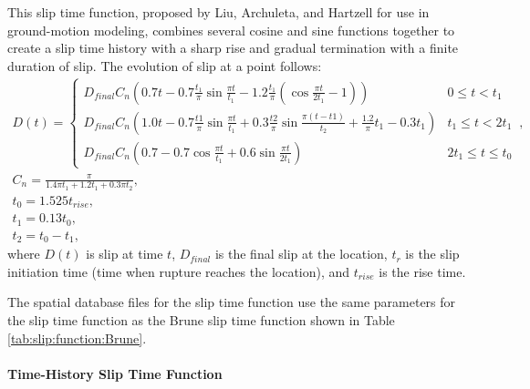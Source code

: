 This slip time function, proposed by Liu, Archuleta, and Hartzell
for use in ground-motion modeling\cite{Liu:etal:2006}, combines several
cosine and sine functions together to create a slip time history with
a sharp rise and gradual termination with a finite duration of slip.
The evolution of slip at a point follows: 
\begin{gather}
D(t)=\left\{ \begin{array}{cc}
D_{\mathit{final}}C_{n}\left(0.7t-0.7\frac{t_{1}}{\pi}\sin\frac{\pi t}{t_{1}}-1.2\frac{t_{1}}{\pi}\left(\cos\frac{\pi t}{2t_{1}}-1\right)\right) & 0\leq t<t_{1}\\
D_{\mathit{final}}C_{n}\left(1.0t-0.7\frac{t1}{\pi}\sin\frac{\pi t}{t_{1}}+0.3\frac{t2}{\pi}\sin\frac{\pi(t-t1)}{t_{2}}+\frac{1.2}{\pi}t_{1}-0.3t_{1}\right) & t_{1}\leq t<2t_{1}\\
D_{\mathit{final}}C_{n}\left(0.7-0.7\cos\frac{\pi t}{t_{1}}+0.6\sin\frac{\pi t}{2t_{1}}\right) & 2t_{1}\leq t\leq t_{0}
\end{array}\right.\,,\\
C_{n}=\frac{\pi}{1.4\pi t_{1}+1.2t_{1}+0.3\pi t_{2}},\\
t_{0}=1.525t_{\mathit{rise}},\\
t_{1}=0.13t_{0},\\
t_{2}=t_{0}-t_{1},
\end{gather}
where $D(t)$ is slip at time $t$, $D_{final}$ is the final slip
at the location, $t_{r}$ is the slip initiation time (time when rupture
reaches the location), and $t_{\mathit{rise}}$ is the rise time.
\begin{inventory}
\end{inventory}
The spatial database files for the slip time function use the same
parameters for the slip time function as the Brune slip time function
shown in Table \vref{tab:slip:function:Brune}.


\paragraph{Time-History Slip Time Function}


